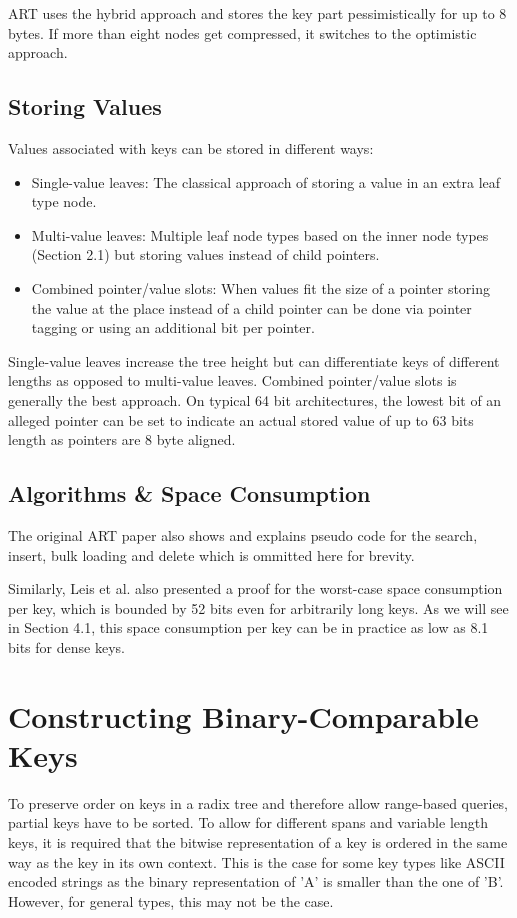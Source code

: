 \documentclass[acmtog, nonacm]{acmart}
\begin{document}
ART uses the hybrid approach and stores the key part pessimistically for up to 8 bytes. If more than eight nodes 
get compressed, it switches to the optimistic approach.

\subsection{Storing Values}
Values associated with keys can be stored in different ways:
\begin{itemize}
    \item Single-value leaves: The classical approach of storing a value in an extra leaf type node.
    \item Multi-value leaves: Multiple leaf node types based on the inner node types (Section 2.1) 
    but storing values instead of child pointers.
    \item Combined pointer/value slots: When values fit the size of a pointer storing the value at the place instead 
    of a child pointer can be done via pointer tagging or using an additional bit per pointer.
\end{itemize}

Single-value leaves increase the tree height but can differentiate keys of different lengths as opposed to 
multi-value leaves. Combined pointer/value slots is generally the best approach. On typical 64 bit architectures, 
the lowest bit of an alleged pointer can be set to indicate an actual stored value of up to 63 bits length as 
pointers are 8 byte aligned.

\subsection{Algorithms \& Space Consumption}
The original ART paper \cite{6544812} also shows and explains pseudo code for the search, insert, 
bulk loading and delete which is ommitted here for brevity.

Similarly, Leis et al. also presented a proof for the worst-case space consumption per key, which is bounded by 52 bits even for
arbitrarily long keys. As we will see in Section 4.1, this space consumption per key can be in practice as low as 8.1 bits
for dense keys.

\section{Constructing Binary-Comparable Keys}

To preserve order on keys in a radix tree and therefore allow range-based queries, partial keys have to be sorted. 
To allow for different spans and variable length keys, it is required that the bitwise representation of a key is 
ordered in the same way as the key in its own context. This is the case for some key types like ASCII encoded strings 
as the binary representation of 'A' is smaller than the one of 'B'. However, for general types, this may not be the case.
\end{document}
